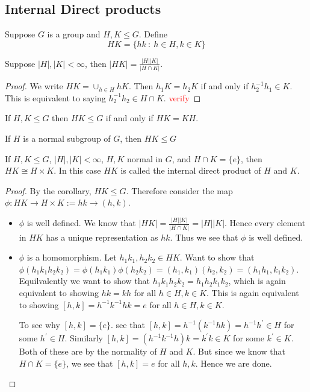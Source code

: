 
\chapter{}

\section{Internal Direct products}

Suppose $G$ is a group and $H, K \leqslant G$. Define \[
     HK = \{ hk  \ : \  h \in H, k \in K \}
\]

\begin{theorem}
  Suppose $|H|, |K| < \infty$, then $|HK| = \frac{|H||K|}{|H \cap K|}$.
\end{theorem}
\begin{proof}
   We write $HK = \cup_{h \in H}hK$. Then $h_1K  = h_2K$ if and only if $h_2^{-1}h_1 \in K$. This is equivalent to saying $h_2^{-1}h_2 \in H\cap K$. \textcolor{red}{verify}
\end{proof}

\begin{theorem}
   If $H, K \leqslant G$ then $HK \leqslant G$ if and only if $HK = KH$.
\end{theorem}

\begin{corollary}
If $H$ is a normal subgroup of $G$, then $HK \leqslant G$
\end{corollary}


\begin{theorem}
  If $H, K \leqslant G$, $|H|, |K| < \infty$, $H, K$ normal in $G$, and $H \cap K = \{ e \}$, then $HK \cong H \times K$. In this case $HK$ is called the internal direct product of $H$ and $K$.
\end{theorem}
\begin{proof}
  By the corollary, $HK \leqslant G$. Therefore consider the map $\phi: HK \to H \times K := hk \to (h, k)$. \begin{itemize}
    \item $\phi$ is well defined. We know that $|HK| = \frac{|H||K|}{|H \cap K|} = |H||K|$. Hence every element in $HK$ has a unique representation as $hk$. Thus we see that $\phi$ is well defined.
    \item $\phi$ is a homomorphism. Let $h_1k_1, h_2k_2 \in HK$. Want to show that $\phi(h_1k_1h_2k_2) = \phi(h_1k_1)\phi(h_2k_2) = (h_1, k_1)(h_2, k_2) = (h_1h_1, k_1k_2)$. Equilvalently we  want to show that $h_1k_1h_2k_2 = h_1h_2k_1k_2$, which is again equivalent to showing $hk = kh$ for all $h \in H, k \in K$. This is again equivalent to showing $[h, k] = h^{-1}k^{-1}hk = e$ for all $ h\in H, k \in K$.

      To see why $[h, k] = \{ e \}$. see that $[h, k] = h^{-1}(k^{-1}hk) = h^{-1}h^\prime \in H$ for some $ h^\prime \in H$. Similarly $[h, k] = (h^{-1}k^{-1}h) k = k^\prime k \in K$ for some $k^\prime \in K$. Both of these are by the normality of $H$ and $K$. But since we know that $H \cap K = \{ e \}$, we see that $[h, k] = e$ for all $h, k$. Hence we are done.
  \end{itemize}
\end{proof}
